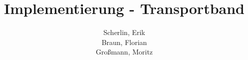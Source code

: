 


	
	\title{Implementierung - Transportband \an{\fdz{}}}
	\author{Scherlin, Erik\\ Braun, Florian\\ Großmann, Moritz}
	\maketitle
	
	\newpage
	\tableofcontents
	
	\newpage
    
